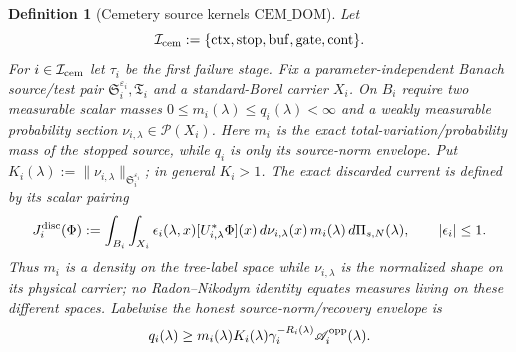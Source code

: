 \documentclass[11pt]{article}
\newtheorem{definition}[theorem]{Definition}
\begin{document}
\begin{definition}[Cemetery source kernels
$\mathrm{CEM\_DOM}$]
\label{def:cemetery-source-domination}
Let
\[
 \mathcal I_{\rm cem}:=
 \{\mathrm{ctx},\mathrm{stop},\mathrm{buf},
   \mathrm{gate},\mathrm{cont}\}.
\]
For $i\in\mathcal I_{\rm cem}$ let
$\tau_i$ be the first failure stage.  Fix a parameter-independent Banach
source/test pair
$\mathfrak S_i^{\varepsilon_i},\mathfrak T_i$ and a standard-Borel carrier
$X_i$.  On $B_i$ require two measurable scalar masses
$0\le m_i(\lambda)\le q_i(\lambda)<\infty$ and a weakly measurable
probability section $\nu_{i,\lambda}\in\mathcal P(X_i)$.  Here $m_i$ is the
exact total-variation/probability mass of the stopped source, while $q_i$ is
only its source-norm envelope.  Put
$K_i(\lambda):=\|\nu_{i,\lambda}\|_{\mathfrak S_i^{\varepsilon_i}}$; in
general $K_i>1$.  The exact discarded current is
defined by its scalar pairing
\begin{equation}
\label{eq:exact-stopped-source-factorization}
 J_i^{\rm disc}(\Phi):=
 \int_{B_i}\int_{X_i}
   \epsilon_i(\lambda,x)[U_{i,\lambda}^{*}\Phi](x)
   \,d\nu_{i,\lambda}(x)\,m_i(\lambda)\,d\Pi_{s,N}(\lambda),
 \qquad |\epsilon_i|\le1.
\end{equation}
Thus $m_i$ is a density on the tree-label space while $\nu_{i,\lambda}$ is
the normalized shape on its physical carrier; no Radon--Nikodym identity
equates measures living on these different spaces.  Labelwise the honest
source-norm/recovery envelope is
\begin{equation}
\label{eq:cemetery-fixed-source-norm}
 q_i(\lambda)\ge
 m_i(\lambda)K_i(\lambda)\gamma_i^{-R_i(\lambda)}
 \mathscr A_i^{\rm opp}(\lambda).
\end{equation}


\end{definition}
\end{document}
